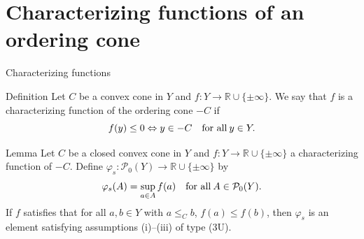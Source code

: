 \documentclass[aspectratio=169, dvipdfmx, 11pt]{beamer}
\newcommand{\RealNumberSet}{\mathbb{R}}
\newcommand{\Interior}[1]{\text{\rm int\:${#1}$}} %
\newcommand{\pow}[1]{\mathcal{P}_{0}(#1)}
\newcommand{\notsetrel}[2]{{\not\preccurlyeq}^{(#1)}_{#2}\!}
\begin{document}


\section{Characterizing functions of an ordering cone}

\begin{frame}{Characterizing functions}
  \begin{block}{Definition}
    Let $C$ be a convex cone in $Y$ and $f: Y \to \RealNumberSet \cup \{\pm \infty\}$.
    We say that $f$ is a characterizing function of the ordering cone $-C$ if
    \begin{equation}
      f(y) \leq 0 \Leftrightarrow y \in -C \quad \text{for all}\: y \in Y. \notag
    \end{equation}
  \end{block}

  \begin{block}{Lemma}
    Let $C$ be a closed convex cone in $Y$ and $f: Y \to \RealNumberSet \cup \{\pm \infty\}$
    a characterizing function of $-C$. Define $\varphi_s : \pow{Y} \to \RealNumberSet \cup \{\pm \infty\}$ by
    \begin{equation}
      \varphi_s (A) = \sup_{a \in A} f(a) \quad \text{for all}\: A \in \pow{Y}. \notag
    \end{equation}
    If $f$ satisfies that for all $a, b \in Y$ with $a \leq_{C} b$, $f(a) \leq f(b)$,
    then $\varphi_s$ is an element satisfying assumptions (i)--(iii) of type (3U).
  \end{block}
\end{frame}
\end{document}
